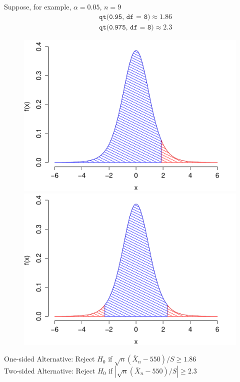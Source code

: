 \documentclass[handout]{beamer}
\begin{document}
\begin{frame}
Suppose, for example, $\alpha = 0.05$, $n = 9$
	\begin{eqnarray*}
		&&\texttt{qt(0.95, df  = 8)}\approx 1.86\\
		 &&\texttt{qt(0.975, df  = 8)}\approx 2.3
	\end{eqnarray*}
\begin{figure}
\includegraphics[scale = 0.3]{./images/one_side}
\includegraphics[scale = 0.3]{./images/two_side}
\end{figure}
One-sided Alternative: Reject $H_0$ if $\sqrt{n}(\bar{X}_n - 550)/S \geq 1.86$\\
\vspace{0.5em}
Two-sided Alternative: Reject $H_0$ if $\left|\sqrt{n}(\bar{X}_n - 550)/S\right| \geq 2.3$\\

\end{frame}
\end{document}
